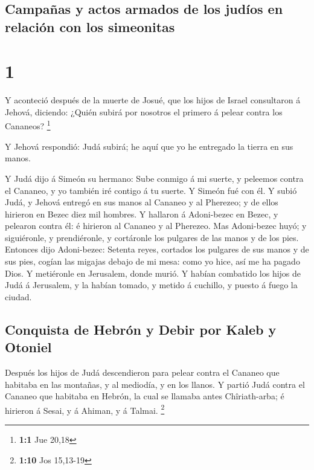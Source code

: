 \hypertarget{campauxf1as-y-actos-armados-de-los-juduxedos-en-relaciuxf3n-con-los-simeonitas}{%
\subsection{Campañas y actos armados de los judíos en relación con los
simeonitas}\label{campauxf1as-y-actos-armados-de-los-juduxedos-en-relaciuxf3n-con-los-simeonitas}}

\hypertarget{section}{%
\section{1}\label{section}}

 Y aconteció después de la muerte de Josué, que los hijos de
Israel consultaron á Jehová, diciendo: ¿Quién subirá por nosotros el
primero á pelear contra los Cananeos? \footnote{\textbf{1:1} Jue 20,18}

 Y Jehová respondió: Judá subirá; he aquí que yo he
entregado la tierra en sus manos.

 Y Judá dijo á Simeón su hermano: Sube conmigo á mi suerte,
y peleemos contra el Cananeo, y yo también iré contigo á tu suerte. Y
Simeón fué con él.  Y subió Judá, y Jehová entregó en sus
manos al Cananeo y al Pherezeo; y de ellos hirieron en Bezec diez mil
hombres.  Y hallaron á Adoni-bezec en Bezec, y pelearon
contra él: é hirieron al Cananeo y al Pherezeo.  Mas
Adoni-bezec huyó; y siguiéronle, y prendiéronle, y cortáronle los
pulgares de las manos y de los pies.  Entonces dijo
Adoni-bezec: Setenta reyes, cortados los pulgares de sus manos y de sus
pies, cogían las migajas debajo de mi mesa: como yo hice, así me ha
pagado Dios. Y metiéronle en Jerusalem, donde murió.  Y
habían combatido los hijos de Judá á Jerusalem, y la habían tomado, y
metido á cuchillo, y puesto á fuego la ciudad.

\hypertarget{conquista-de-hebruxf3n-y-debir-por-kaleb-y-otoniel}{%
\subsection{Conquista de Hebrón y Debir por Kaleb y
Otoniel}\label{conquista-de-hebruxf3n-y-debir-por-kaleb-y-otoniel}}

 Después los hijos de Judá descendieron para pelear contra
el Cananeo que habitaba en las montañas, y al mediodía, y en los llanos.
 Y partió Judá contra el Cananeo que habitaba en Hebrón, la
cual se llamaba antes Chîriath-arba; é hirieron á Sesai, y á Ahiman, y á
Talmai. \footnote{\textbf{1:10} Jos 15,13-19}

